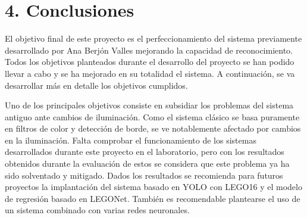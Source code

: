 {%


\section*{4. Conclusiones}
El objetivo final de este proyecto es el perfeccionamiento del sistema previamente desarrollado por Ana Berjón Valles \citep{TFGAna} mejorando la capacidad de reconocimiento. Todos los objetivos planteados durante el desarrollo del proyecto se han podido llevar a cabo y se ha mejorado en su totalidad el sistema. A continuación, se va desarrollar más en detalle los objetivos cumplidos.

Uno de los principales objetivos consiste en subsidiar los problemas del sistema antiguo ante cambios de iluminación. Como el sistema clásico se basa puramente en filtros de color y detección de borde, se ve notablemente afectado por cambios en la iluminación. Falta comprobar el funcionamiento de los sistemas desarrollados durante este proyecto en el laboratorio, pero con los resultados obtenidos durante la evaluación de estos se considera que este problema ya ha sido solventado y mitigado. Dados los resultados se recomienda para futuros proyectos la implantación del sistema basado en YOLO con LEGO16 y el modelo de regresión basado en LEGONet. También es recomendable plantearse el uso de un sistema combinado con varias redes neuronales.

}
